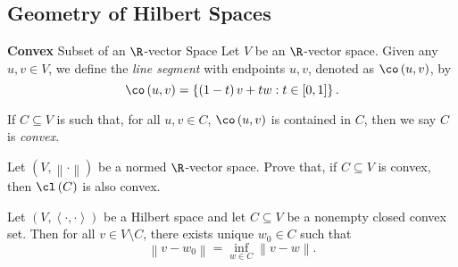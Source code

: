 \documentclass[pmath450]{subfiles}
\begin{document}
    \subsection{Geometry of Hilbert Spaces}
    
    \begin{recall}{\textbf{Convex} Subset of an $\R$-vector Space}
        Let $V$ be an $\R$-vector space. Given any $u,v\in V$, we define the \emph{line segment} with endpoints $u,v$, denoted as $\co\left( u,v \right)$, by
        \begin{equation*}
            \co\left( u,v \right) = \left\lbrace \left( 1-t \right)v+tw: t\in\left[ 0,1 \right] \right\rbrace.
        \end{equation*}

        If $C\subseteq V$ is such that, for all $u,v\in C$, $\co\left( u,v \right)$ is contained in $C$, then we say $C$ is \emph{convex}.
    \end{recall}

    \begin{exercise}{}
        Let $\left( V,\left\lVert \cdot\right\rVert \right)$ be a normed $\R$-vector space. Prove that, if $C\subseteq V$ is convex, then $\cl\left( C \right)$ is also convex.
    \end{exercise}

    \rruleline
    
    \begin{prop}{}
        Let $\left( V,\left\langle \cdot, \cdot\right\rangle \right)$ be a Hilbert space and let $C\subseteq V$ be a nonempty closed convex set. Then for all $v\in V\setminus C$, there exists unique $w_0\in C$ such that
        \begin{equation*}
            \left\lVert v-w_0\right\rVert = \inf_{w\in C}\left\lVert v-w\right\rVert.
        \end{equation*}
    \end{prop}
    \clearpage
\end{document}

